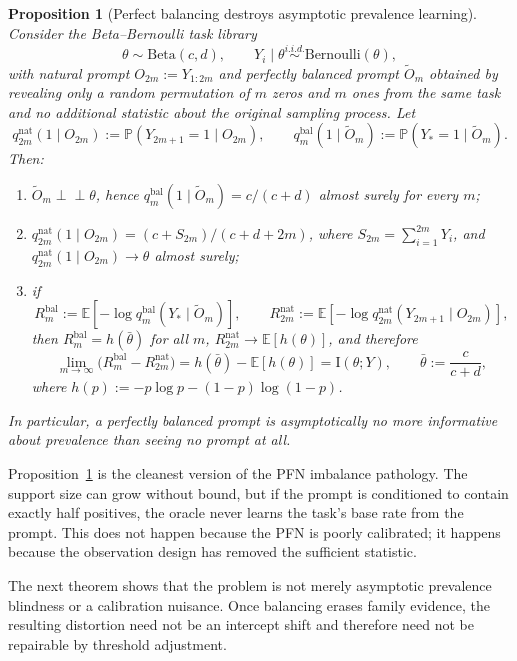 \documentclass{article}
\newtheorem{proposition}[theorem]{Proposition}
\theoremstyle{definition}
\theoremstyle{remark}
\newcommand{\E}{\mathbb{E}}
\newcommand{\Pbb}{\mathbb{P}}
\newcommand{\I}{\mathrm{I}}
\newcommand{\Ber}{\mathrm{Bernoulli}}
\newcommand{\BetaDist}{\mathrm{Beta}}
\begin{document}
\begin{proposition}[Perfect balancing destroys asymptotic prevalence learning]
\label{prop:balanced-useless}
Consider the Beta--Bernoulli task library
\[
\theta \sim \BetaDist(c,d),
\qquad
Y_i\mid \theta \stackrel{i.i.d.}{\sim} \Ber(\theta),
\]
with natural prompt $O_{2m}:=Y_{1:2m}$ and perfectly balanced prompt $\widetilde O_m$ obtained by revealing only a random permutation of $m$ zeros and $m$ ones from the same task and no additional statistic about the original sampling process. Let
\[
q_{2m}^{\mathrm{nat}}(1\mid O_{2m}) := \Pbb(Y_{2m+1}=1\mid O_{2m}),
\qquad
q_m^{\mathrm{bal}}(1\mid \widetilde O_m) := \Pbb(Y_*=1\mid \widetilde O_m).
\]
Then:
\begin{enumerate}[leftmargin=18pt]
\item $\widetilde O_m \perp\!\!\!\perp \theta$, hence $q_m^{\mathrm{bal}}(1\mid \widetilde O_m)=c/(c+d)$ almost surely for every $m$;
\item $q_{2m}^{\mathrm{nat}}(1\mid O_{2m})=(c+S_{2m})/(c+d+2m)$, where $S_{2m}=\sum_{i=1}^{2m}Y_i$, and $q_{2m}^{\mathrm{nat}}(1\mid O_{2m})\to \theta$ almost surely;
\item if
\[
R_m^{\mathrm{bal}} := \E[-\log q_m^{\mathrm{bal}}(Y_*\mid \widetilde O_m)],
\qquad
R_{2m}^{\mathrm{nat}} := \E[-\log q_{2m}^{\mathrm{nat}}(Y_{2m+1}\mid O_{2m})],
\]
then $R_m^{\mathrm{bal}} = h(\bar \theta)$ for all $m$, $R_{2m}^{\mathrm{nat}}\to \E[h(\theta)]$, and therefore
\[
\lim_{m\to\infty}\bigl(R_m^{\mathrm{bal}} - R_{2m}^{\mathrm{nat}}\bigr)
=
h(\bar \theta)-\E[h(\theta)]
=
\I(\theta;Y),
\qquad
\bar \theta:=\frac{c}{c+d},
\]
where $h(p):=-p\log p -(1-p)\log(1-p)$.
\end{enumerate}
In particular, a perfectly balanced prompt is asymptotically no more informative about prevalence than seeing no prompt at all.
\end{proposition}

Proposition~\ref{prop:balanced-useless} is the cleanest version of the PFN imbalance pathology. The support size can grow without bound, but if the prompt is conditioned to contain exactly half positives, the oracle never learns the task's base rate from the prompt. This does not happen because the PFN is poorly calibrated; it happens because the observation design has removed the sufficient statistic.

The next theorem shows that the problem is not merely asymptotic prevalence blindness or a calibration nuisance. Once balancing erases family evidence, the resulting distortion need not be an intercept shift and therefore need not be repairable by threshold adjustment.
\end{document}
